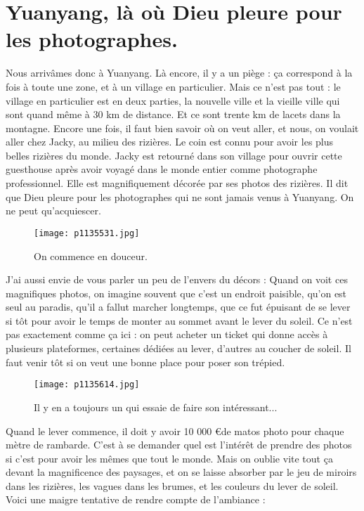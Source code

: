 \documentclass{book}
\begin{document}
\chapter{Yuanyang, là où Dieu pleure pour les photographes.}
Nous arrivâmes donc à Yuanyang. Là encore, il y a un piège : ça correspond à la fois à toute une zone, et à un village en particulier. Mais ce n'est pas tout : le village en particulier est en deux parties, la nouvelle ville et la vieille ville qui sont quand même à 30 km de distance. Et ce sont trente km de lacets dans la montagne. Encore une fois, il faut bien savoir où on veut aller, et nous, on voulait aller chez Jacky, au milieu des rizières. Le coin est connu pour avoir les plus belles rizières du monde. Jacky est retourné dans son village pour ouvrir cette guesthouse après avoir voyagé dans le monde entier comme photographe professionnel. Elle est magnifiquement décorée par ses photos des rizières. Il dit que Dieu pleure pour les photographes qui ne sont jamais venus à Yuanyang. On ne peut qu'acquiescer.


\begin{figure}[h]
\centering
\texttt{[image: p1135531.jpg]}
\caption*{On commence en douceur.}
\end{figure}

J'ai aussi envie de vous parler un peu de l'envers du décors : Quand on voit ces magnifiques photos, on imagine souvent que c'est un endroit paisible, qu'on est seul au paradis, qu'il a fallut marcher longtemps, que ce fut épuisant de se lever si tôt pour avoir le temps de monter au sommet avant le lever du soleil. Ce n'est pas exactement comme ça ici : on peut acheter un ticket qui donne accès à plusieurs plateformes, certaines dédiées au lever, d'autres au coucher de soleil. Il faut venir tôt si on veut une bonne place pour poser son trépied.


\begin{figure}[h]
\centering
\texttt{[image: p1135614.jpg]}
\caption*{Il y en a toujours un qui essaie de faire son intéressant...}
\end{figure}

Quand le lever commence, il doit y avoir 10 000 \euro de matos photo pour chaque mètre de rambarde. C'est à se demander quel est l'intérêt de prendre des photos si c'est pour avoir les mêmes que tout le monde. Mais on oublie vite tout ça devant la magnificence des paysages, et on se laisse absorber par le jeu de miroirs dans les rizières, les vagues dans les brumes, et les couleurs du lever de soleil. Voici une maigre tentative de rendre compte de l'ambiance :
\end{document}
